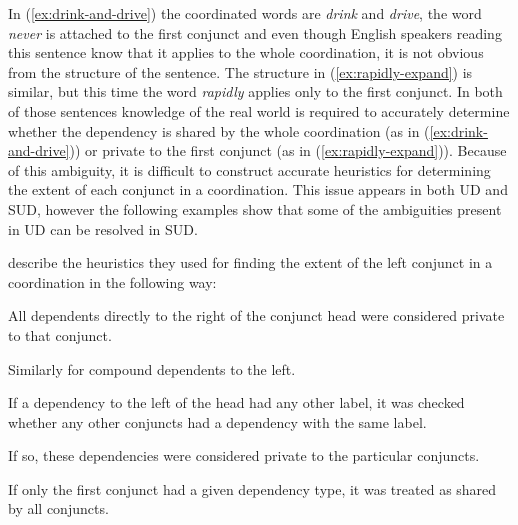 In (\ref{ex:drink-and-drive}) the coordinated words are \textsl{drink} and \textsl{drive}, the word \textsl{never} is attached to the first conjunct and even though English speakers reading this sentence know that it applies to the whole coordination, it is not obvious from the structure of the sentence. The structure in (\ref{ex:rapidly-expand}) is similar, but this time the word \textsl{rapidly} applies only to the first conjunct. In both of those sentences knowledge of the real world is required to accurately determine whether the dependency is shared by the whole coordination (as in (\ref{ex:drink-and-drive})) or private to the first conjunct (as in (\ref{ex:rapidly-expand})). Because of this ambiguity, it is difficult to construct accurate heuristics for determining the extent of each conjunct in a coordination. This issue appears in both UD and SUD, however the following examples show that some of the ambiguities present in UD can be resolved in SUD.


\cite{prz:etal:24} describe the heuristics they used for finding the extent of the left conjunct in a coordination in the following way:

\begin{xlist}
    \ex\label{h:right} All dependents directly to the right of the conjunct head were considered private to that conjunct.

    \ex\label{h:compound} Similarly for compound dependents to the left.

    \ex\label{h:left} If a dependency to the left of the head had any other label, it was checked whether any other conjuncts had a dependency with the same label.
    \begin{xlist}
        \ex\label{h:left-priv} If so, these dependencies were considered private to the particular conjuncts.

        \ex\label{h:left-shared} If only the first conjunct had a given dependency type, it was treated as shared by all conjuncts.
    \end{xlist}
\end{xlist}

